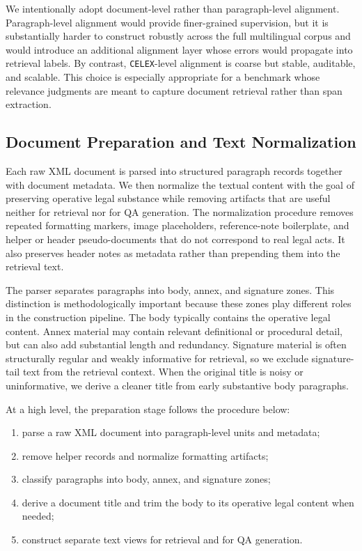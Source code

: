 We intentionally adopt document-level rather than paragraph-level alignment. Paragraph-level alignment would provide finer-grained supervision, but it is substantially harder to construct robustly across the full multilingual corpus and would introduce an additional alignment layer whose errors would propagate into retrieval labels. By contrast, \texttt{CELEX}-level alignment is coarse but stable, auditable, and scalable. This choice is especially appropriate for a benchmark whose relevance judgments are meant to capture document retrieval rather than span extraction.

\subsection{Document Preparation and Text Normalization}

Each raw XML document is parsed into structured paragraph records together with document metadata. We then normalize the textual content with the goal of preserving operative legal substance while removing artifacts that are useful neither for retrieval nor for QA generation. The normalization procedure removes repeated formatting markers, image placeholders, reference-note boilerplate, and helper or header pseudo-documents that do not correspond to real legal acts. It also preserves header notes as metadata rather than prepending them into the retrieval text.

The parser separates paragraphs into body, annex, and signature zones. This distinction is methodologically important because these zones play different roles in the construction pipeline. The body typically contains the operative legal content. Annex material may contain relevant definitional or procedural detail, but can also add substantial length and redundancy. Signature material is often structurally regular and weakly informative for retrieval, so we exclude signature-tail text from the retrieval context. When the original title is noisy or uninformative, we derive a cleaner title from early substantive body paragraphs.

At a high level, the preparation stage follows the procedure below:
\begin{enumerate}
\item parse a raw XML document into paragraph-level units and metadata;
\item remove helper records and normalize formatting artifacts;
\item classify paragraphs into body, annex, and signature zones;
\item derive a document title and trim the body to its operative legal content when needed;
\item construct separate text views for retrieval and for QA generation.
\end{enumerate}

